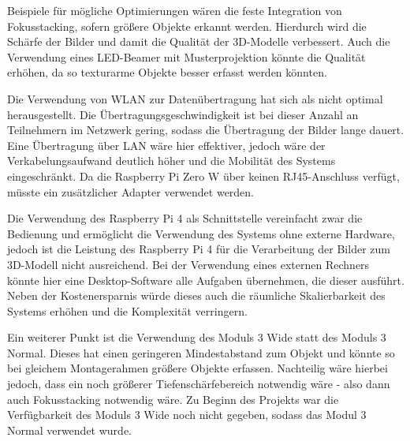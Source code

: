 \documentclass[./00PhotoBox.tex]{subfiles}
\begin{document}
Beispiele für mögliche Optimierungen wären die feste Integration von Fokusstacking, sofern größere Objekte erkannt werden. Hierdurch wird die Schärfe der Bilder und damit die Qualität der 3D-Modelle verbessert. Auch die Verwendung eines LED-Beamer mit Musterprojektion könnte die Qualität erhöhen, da so texturarme Objekte besser erfasst werden könnten.

Die Verwendung von WLAN zur Datenübertragung hat sich als nicht optimal herausgestellt. Die Übertragungsgeschwindigkeit ist bei dieser Anzahl an Teilnehmern im Netzwerk gering, sodass die Übertragung der Bilder lange dauert. Eine Übertragung über LAN wäre hier effektiver, jedoch wäre der Verkabelungsaufwand deutlich höher und die Mobilität des Systems eingeschränkt. Da die Raspberry Pi Zero W über keinen RJ45-Anschluss verfügt, müsste ein zusätzlicher Adapter verwendet werden.

Die Verwendung des Raspberry Pi 4 als Schnittstelle vereinfacht zwar die Bedienung und ermöglicht die Verwendung des Systems ohne externe Hardware, jedoch ist die Leistung des Raspberry Pi 4 für die Verarbeitung der Bilder zum 3D-Modell nicht ausreichend. Bei der Verwendung eines externen Rechners könnte hier eine Desktop-Software alle Aufgaben übernehmen, die dieser ausführt. Neben der Kostenersparnis würde dieses auch die räumliche Skalierbarkeit des Systems erhöhen und die Komplexität verringern.

Ein weiterer Punkt ist die Verwendung des Moduls 3 Wide statt des Moduls 3 Normal. Dieses hat einen geringeren Mindestabstand zum Objekt und könnte so bei gleichem Montagerahmen größere Objekte erfassen. Nachteilig wäre hierbei jedoch, dass ein noch größerer Tiefenschärfebereich notwendig wäre - also dann auch Fokusstacking notwendig wäre. Zu Beginn des Projekts war die Verfügbarkeit des Moduls 3 Wide noch nicht gegeben, sodass das Modul 3 Normal verwendet wurde.




\biblio
\end{document}
